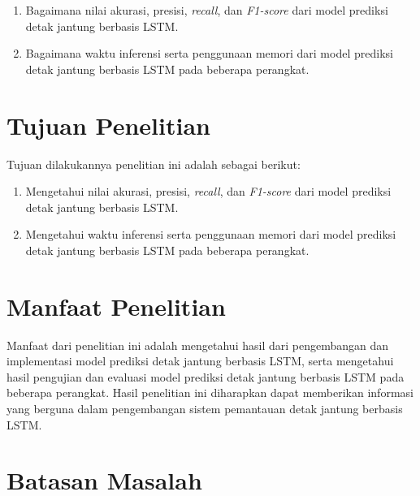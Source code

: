 \begin{enumerate}
  \item Bagaimana nilai akurasi, presisi, \emph{recall}, dan \emph{F1-score} dari model prediksi detak jantung berbasis LSTM.
  \item Bagaimana waktu inferensi serta penggunaan memori dari model prediksi detak jantung berbasis LSTM pada beberapa perangkat.
\end{enumerate}


\section{Tujuan Penelitian}
Tujuan dilakukannya penelitian ini adalah sebagai berikut:

\begin{enumerate}
  \item Mengetahui nilai akurasi, presisi, \emph{recall}, dan \emph{F1-score} dari model prediksi detak jantung berbasis LSTM.
  \item Mengetahui waktu inferensi serta penggunaan memori dari model prediksi detak jantung berbasis LSTM pada beberapa perangkat.
\end{enumerate}


\section{Manfaat Penelitian}

Manfaat dari penelitian ini adalah mengetahui hasil dari pengembangan dan implementasi model prediksi detak jantung berbasis LSTM, serta mengetahui hasil pengujian dan evaluasi model prediksi detak jantung berbasis LSTM pada beberapa perangkat. Hasil penelitian ini diharapkan dapat memberikan informasi yang berguna dalam pengembangan sistem pemantauan detak jantung berbasis LSTM.


\section{Batasan Masalah}

